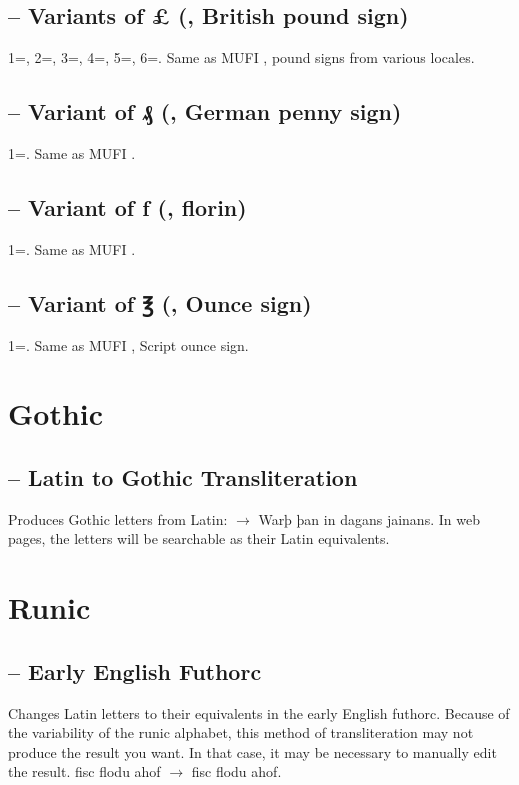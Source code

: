 \subsection{ -- Variants of {\pounds} (, British pound sign)}
1=, 2=, 3=, 4=,
5=, 6=. Same as MUFI , pound signs from various locales.

\subsection{ -- Variant of ₰ (, German penny sign)}
1=. Same as MUFI .

\subsection{ -- Variant of ƒ (, florin)}
1=. Same as MUFI .

\subsection{ -- Variant of ℥ (, Ounce sign)}
1=. Same as MUFI , Script ounce sign.

\section{Gothic}
\subsection{ -- Latin to Gothic Transliteration}
Produces Gothic letters from Latin:  $\rightarrow $
{Warþ þan in dagans
jainans}. In web pages, the letters will be searchable as their Latin equivalents.

\section{Runic}
\subsection{ -- Early English Futhorc}
Changes Latin letters to their equivalents in the early English futhorc. Because of the variability of the runic
alphabet, this method of transliteration may not produce the result you want. In that case, it may be necessary to
manually edit the result. fisc flodu ahof $\rightarrow $ {fisc flodu ahof}.

